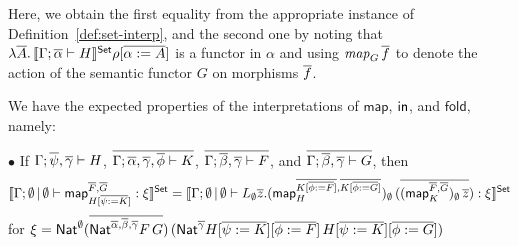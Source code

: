 \documentclass{lmcs}
\theoremstyle{plain}\newtheorem{satz}[thm]{Satz}
\newcommand{\fold}{\mathsf{fold}}
\renewcommand{\id}{\mathit{id}}
\newcommand{\map}{\mathsf{map}}
\begin{document}
\begin{comment}
\[\begin{array}{rl}
&\setsem{
\Gamma;\emptyset \,|\, \emptyset
\vdash \map^{\ol{\sigma},\ol{\tau}}_H
: \Nat^\emptyset\;(\ol{\Nat^{\emptyset}\,\sigma\,\tau})\; {}
(\Nat^{\emptyset}\,H[\ol{\alpha := \sigma}]\,H[\ol{\alpha := \tau}])
} \rho\, \ast \\
=& \lambda \ol{f : \setsem{\Gamma; \emptyset \vdash \sigma}\rho \to \setsem{\Gamma; \emptyset \vdash \tau}\rho}.\,
\setsem{\Gamma; \ol{\alpha}\vdash H}
\id_{\rho}[\ol{\alpha := f}] \\
=& \lambda \ol{f : \setsem{\Gamma; \emptyset \vdash \sigma}\rho \to \setsem{\Gamma; \emptyset \vdash \tau}\rho}.\,
\mathit{map}_{\lambda \ol{A}.\,\setsem{\Gamma; \ol{\alpha}\vdash H} \rho [\ol{\alpha := A}]} \ol{f} \\
=& \mathit{map}_{\lambda \ol{A}.\,\setsem{\Gamma; \ol{\alpha}\vdash H} \rho [\ol{\alpha := A}]}
\end{array}
\]
\end{comment}

\vspace*{0.05in}

\noindent
Here, we obtain the first equality from the appropriate instance of
Definition~\ref{def:set-interp}, and the second one by noting that
$\lambda \overline{A}.\,\llbracket{\Gamma; \overline{\alpha}\vdash H}\rrbracket^{\mathsf{Set}} \rho
[\overline{\alpha := A}]$ is a functor in $\alpha$ and using
$\mathit{map}_G\,\overline{f}$ to denote the action of the semantic functor
$G$ on morphisms $\overline{f}$.

\vspace*{0.1in}

We have the expected properties of the interpretations of $\map$,
$\mathsf{in}$, and $\fold$, namely:

\vspace*{0.1in}

\noindent
$\bullet$\;  If
$\Gamma; \overline{\psi}, \overline{\gamma} \vdash H$,\;
$\overline{\Gamma; \overline{\alpha}, \overline{\gamma}, \overline{\phi} \vdash K}$,\;
$\overline{\Gamma; \overline{\beta}, \overline{\gamma} \vdash F}$,\; and
$\overline{\Gamma; \overline{\beta}, \overline{\gamma} \vdash G}$,
then
\[\setsem{\Gamma; \emptyset \,|\, \emptyset \vdash
\map_{H[\ol{\psi := K}]}^{\ol{F}, \ol{G}} : \xi} = \setsem{\Gamma;
  \emptyset \,|\, \emptyset \vdash L_\emptyset \ol
  z. (\map_H^{\ol{K[\ol{\phi := F}]}, 
    \ol{K[\ol{\phi := G}]}})_\emptyset \,(\ol{(\map_K^{\ol{F}, \ol{G}})_\emptyset \, \ol z}) :
  \xi}\]
for $\xi = \mathsf{Nat}^{\emptyset} (\overline{\mathsf{Nat}^{\overline{\alpha}, \overline{\beta},
    \overline{\gamma}} F\, G})\, (\mathsf{Nat}^{\overline{\gamma}} H[\overline{\psi :=
    K}][\overline{\phi := F}]\, H[\overline{\psi := K}][\overline{\phi := G}])$
\end{document}

